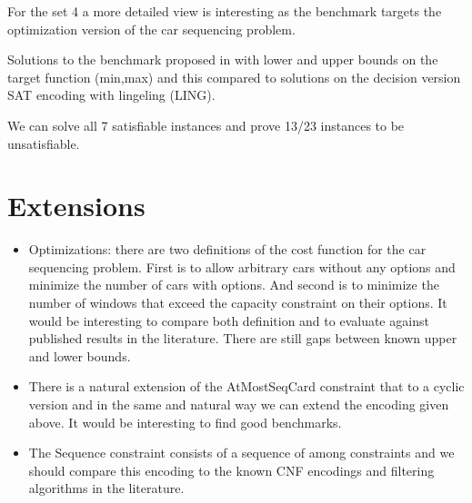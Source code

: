 \documentclass[]{llncs}
\newcommand{\TODO}[1]{ {\color{red}{#1} }}
\begin{document}
For the set 4 a more detailed view is interesting as the benchmark
targets the optimization version of the car sequencing problem. 

\DTLsetseparator{,}

\begin{table}[htbp]
    \caption{Solutions to the benchmark proposed in \TODO{ref} with
    lower and upper bounds on the target function (min,max) and this
compared to solutions on the decision version  SAT encoding with lingeling (LING). }
    \centering
\end{table}


We can solve all 7 satisfiable instances and prove 13/23 instances to be
unsatisfiable. 


\section{Extensions}

\begin{itemize}
    \item Optimizations: there are two definitions of the cost function
        for the car sequencing problem. First is to allow arbitrary cars
        without any options and minimize the number of cars with
        options. And second is to minimize the number of windows that
        exceed the capacity constraint on their options. It would be
        interesting to compare both definition and to evaluate against
        published results in the literature. There are still gaps
        between known upper and lower bounds. 
    \item There is a natural extension of the AtMostSeqCard constraint
        that to a cyclic version and in the same and natural way we can
        extend the encoding given above. It would be interesting to find
        good benchmarks. 
    \item The Sequence constraint consists of a sequence of among
        constraints and we should compare this encoding to the known CNF
        encodings and filtering algorithms in the literature. 
\end{itemize}
\end{document}
